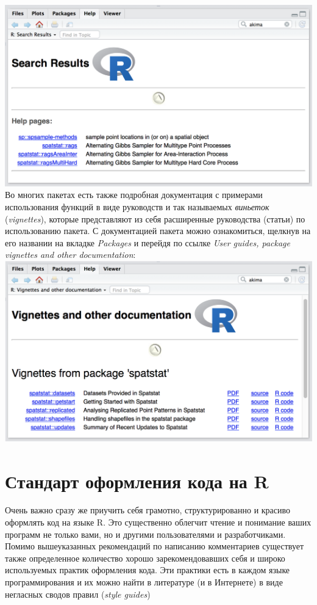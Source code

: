 \documentclass[]{book}
\begin{document}
\includegraphics{images/ch0_spsample.png} Во многих пакетах есть также
подробная документация с примерами использования функций в виде
руководств и так называемых \emph{виньеток} (\emph{vignettes}), которые
представляют из себя расширенные руководства (статьи) по использованию
пакета. С документацией пакета можно ознакомиться, щелкнув на его
названии на вкладке \emph{Packages} и перейдя по ссылке \emph{User
guides, package vignettes and other documentation}:
\includegraphics{images/ch0_vignette.png}

\section*{Стандарт оформления кода на R}\label{----r}

Очень важно сразу же приучить себя грамотно, структурированно и красиво
оформлять код на языке R. Это существенно облегчит чтение и понимание
ваших программ не только вами, но и другими пользователями и
разработчиками. Помимо вышеуказанных рекомендаций по написанию
комментариев существует также определенное количество хорошо
зарекомендовавших себя и широко используемых практик оформления кода.
Эти практики есть в каждом языке программирования и их можно найти в
литературе (и в Интернете) в виде негласных сводов правил (\emph{style
guides})
\end{document}
